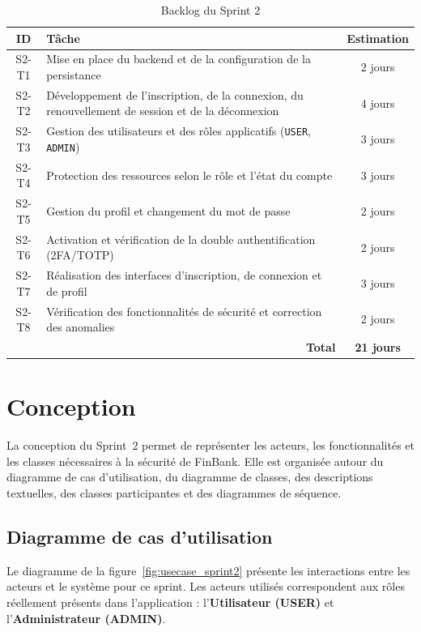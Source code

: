 \begin{table}[htbp]
\centering
\caption{Backlog du Sprint 2}
\label{tab:backlog_sprint2}
\renewcommand{\arraystretch}{1.35}
\begin{tabular}{|c|p{9.5cm}|c|}
\hline
\textbf{ID} & \textbf{Tâche} & \textbf{Estimation} \\
\hline
S2-T1 & Mise en place du backend et de la configuration de la persistance & 2 jours \\
\hline
S2-T2 & Développement de l'inscription, de la connexion, du renouvellement de session et de la déconnexion & 4 jours \\
\hline
S2-T3 & Gestion des utilisateurs et des rôles applicatifs (\texttt{USER}, \texttt{ADMIN}) & 3 jours \\
\hline
S2-T4 & Protection des ressources selon le rôle et l'état du compte & 3 jours \\
\hline
S2-T5 & Gestion du profil et changement du mot de passe & 2 jours \\
\hline
S2-T6 & Activation et vérification de la double authentification (2FA/TOTP) & 2 jours \\
\hline
S2-T7 & Réalisation des interfaces d'inscription, de connexion et de profil & 3 jours \\
\hline
S2-T8 & Vérification des fonctionnalités de sécurité et correction des anomalies & 2 jours \\
\hline
\multicolumn{2}{|r|}{\textbf{Total}} & \textbf{21 jours} \\
\hline
\end{tabular}
\end{table}

\section{Conception}
\label{sec:conception_sprint2}

La conception du Sprint~2 permet de représenter les acteurs, les
fonctionnalités et les classes nécessaires à la sécurité de FinBank.
Elle est organisée autour du diagramme de cas d'utilisation, du
diagramme de classes, des descriptions textuelles, des classes
participantes et des diagrammes de séquence.

\subsection{Diagramme de cas d'utilisation}
\label{subsec:usecase_sprint2}

Le diagramme de la figure~\ref{fig:usecase_sprint2} présente les
interactions entre les acteurs et le système pour ce sprint. Les
acteurs utilisés correspondent aux rôles réellement présents dans
l'application : l'\textbf{Utilisateur (USER)} et
l'\textbf{Administrateur (ADMIN)}.

